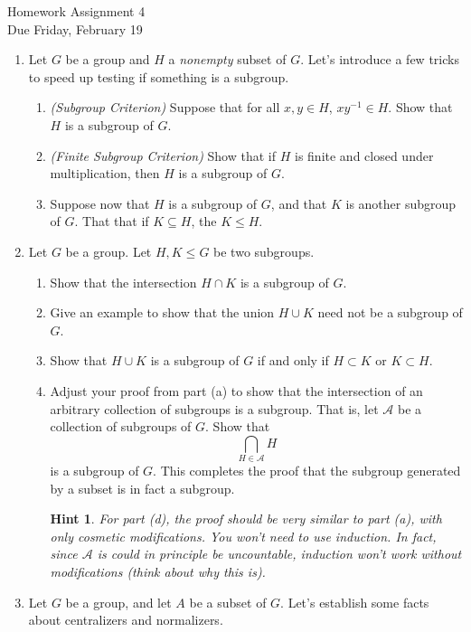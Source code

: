 \documentclass[11pt]{article}
\newtheorem*{hint}{Hint}
\newcommand{\cA}{\mathcal{A}}
\begin{document}
\begin{center}
\Large {Homework Assignment 4}\\
\small {Due Friday, February 19}
\end{center}
\begin{enumerate}
  \item Let $G$ be a group and $H$ a \textit{nonempty} subset of $G$.  Let's introduce a few tricks to speed up testing if something is a subgroup.
  \begin{enumerate}
    \item \textit{(Subgroup Criterion)} Suppose that for all $x,y\in H$, $xy^{-1}\in H$.  Show that $H$ is a subgroup of $G$.
    \item \textit{(Finite Subgroup Criterion)} Show that if $H$ is finite and closed under multiplication, then $H$ is a subgroup of $G$.
    \item Suppose now that $H$ is a subgroup of $G$, and that $K$ is another subgroup of $G$.  That that if $K\subseteq H$, the $K\le H$.
  \end{enumerate}
	\item Let $G$ be a group.  Let $H,K\le G$ be two subgroups.
  \begin{enumerate}
    \item Show that the intersection $H\cap K$ is a subgroup of $G$.
    \item Give an example to show that the union $H\cup K$ need not be a subgroup of $G$.
    \item Show that $H\cup K$ is a subgroup of $G$ if and only if $H\subset K$ or $K\subset H$.
    \item Adjust your proof from part (a) to show that the intersection of an arbitrary collection of subgroups is a subgroup.  That is, let $\cA$ be a collection of subgroups of $G$.  Show that
    \[\bigcap_{H\in\cA}H\]
    is a subgroup of $G$.  This completes the proof that the subgroup generated by a subset is in fact a subgroup.
    \begin{hint}
      For part (d), the proof should be very similar to part (a), with only cosmetic modifications.  You won't need to use induction.  In fact, since $\cA$ is could in principle be uncountable, induction won't work without modifications (think about why this is).
    \end{hint}
  \end{enumerate}
  \item Let $G$ be a group, and let $A$ be a subset of $G$.  Let's establish some facts about centralizers and normalizers.

\end{enumerate}
\end{document}
